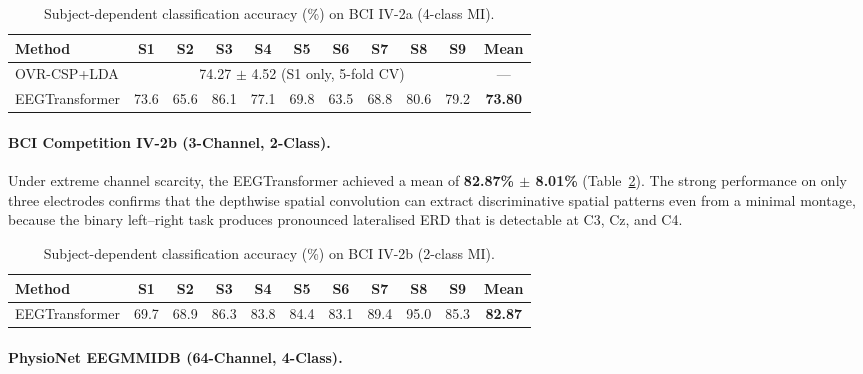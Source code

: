 \documentclass[12pt, a4paper]{article}
\begin{document}
\begin{table}[htbp]
\centering
\caption{Subject-dependent classification accuracy (\%) on BCI IV-2a (4-class MI).}
\label{tab:iv2a_results}
\begin{tabular}{lcccccccccc}
\toprule
\textbf{Method} & \textbf{S1} & \textbf{S2} & \textbf{S3} & \textbf{S4} & \textbf{S5} & \textbf{S6} & \textbf{S7} & \textbf{S8} & \textbf{S9} & \textbf{Mean} \\
\midrule
OVR-CSP+LDA & \multicolumn{9}{c}{74.27 $\pm$ 4.52 (S1 only, 5-fold CV)} & --- \\
EEGTransformer & 73.6 & 65.6 & 86.1 & 77.1 & 69.8 & 63.5 & 68.8 & 80.6 & 79.2 & \textbf{73.80} \\
\bottomrule
\end{tabular}
\end{table}

\paragraph{BCI Competition IV-2b (3-Channel, 2-Class).}

Under extreme channel scarcity, the EEGTransformer achieved a mean of \textbf{82.87\% $\pm$ 8.01\%} (Table~\ref{tab:iv2b_results}). The strong performance on only three electrodes confirms that the depthwise spatial convolution can extract discriminative spatial patterns even from a minimal montage, because the binary left--right task produces pronounced lateralised ERD that is detectable at C3, Cz, and C4.

\begin{table}[htbp]
\centering
\caption{Subject-dependent classification accuracy (\%) on BCI IV-2b (2-class MI).}
\label{tab:iv2b_results}
\begin{tabular}{lcccccccccc}
\toprule
\textbf{Method} & \textbf{S1} & \textbf{S2} & \textbf{S3} & \textbf{S4} & \textbf{S5} & \textbf{S6} & \textbf{S7} & \textbf{S8} & \textbf{S9} & \textbf{Mean} \\
\midrule
EEGTransformer & 69.7 & 68.9 & 86.3 & 83.8 & 84.4 & 83.1 & 89.4 & 95.0 & 85.3 & \textbf{82.87} \\
\bottomrule
\end{tabular}
\end{table}

\paragraph{PhysioNet EEGMMIDB (64-Channel, 4-Class).}
\end{document}
